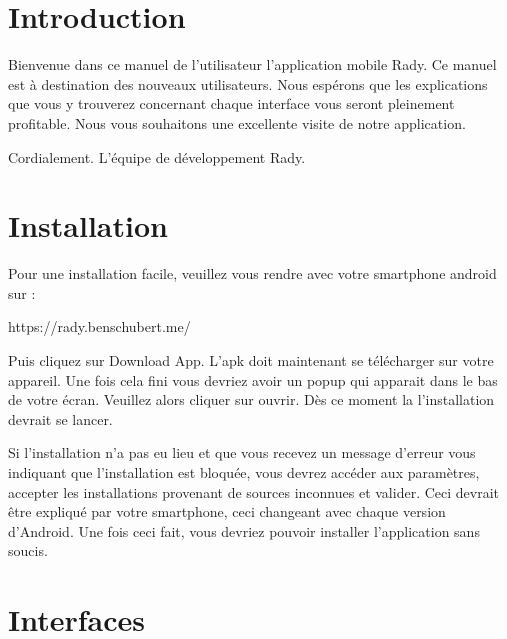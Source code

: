 \documentclass[french]{article}
\begin{document}
	\newpage	
	\section{Introduction}
	Bienvenue dans ce manuel de l’utilisateur l'application mobile Rady. Ce manuel est à destination des nouveaux utilisateurs. Nous espérons que les explications que vous y trouverez concernant chaque interface vous seront pleinement profitable. Nous vous souhaitons une excellente visite de notre application.  
	
	\bigskip
	\bigskip
	
	Cordialement.
	\newline
	L'équipe de développement Rady.
		
	\section{Installation}
	
	Pour une installation facile, veuillez vous rendre avec votre smartphone android sur :
	\bigskip
	
	\centering
	https://rady.benschubert.me/
	
	\bigskip
	\justifying 
	Puis cliquez sur Download App. L'apk doit maintenant se télécharger sur votre appareil. Une fois cela fini vous devriez avoir un popup qui apparait dans le bas de votre écran. Veuillez alors cliquer sur ouvrir.
	Dès ce moment la l'installation devrait se lancer.
	\newline
	\newline
	
	Si l'installation n'a pas eu lieu et que vous recevez un message d'erreur vous indiquant que l'installation est bloquée, vous devrez accéder aux paramètres, accepter les installations provenant de sources inconnues et valider. Ceci devrait être expliqué par votre smartphone, ceci changeant avec chaque version d'Android. Une fois ceci fait, vous devriez pouvoir installer l'application sans soucis.
	
	
	
	\section{Interfaces}
\end{document}

